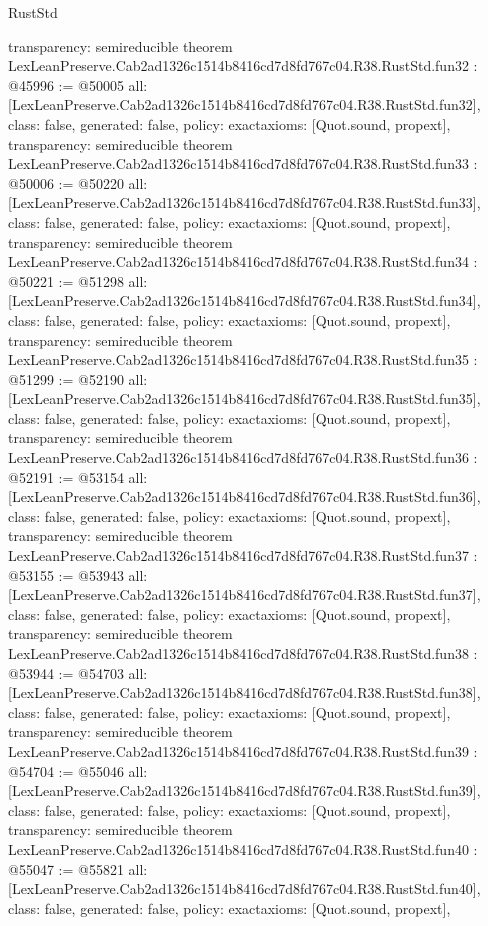 \begin{lexlean}{RustStd}
\begin{coremodule}
{  transparency: semireducible
}
theorem LexLeanPreserve.Cab2ad1326c1514b8416cd7d8fd767c04.R38.RustStd.fun32 : @45996 := @50005 {
  all: [LexLeanPreserve.Cab2ad1326c1514b8416cd7d8fd767c04.R38.RustStd.fun32],
  class: false,
  generated: false,
  policy: exact{axioms: [Quot.sound, propext]},
  transparency: semireducible
}
theorem LexLeanPreserve.Cab2ad1326c1514b8416cd7d8fd767c04.R38.RustStd.fun33 : @50006 := @50220 {
  all: [LexLeanPreserve.Cab2ad1326c1514b8416cd7d8fd767c04.R38.RustStd.fun33],
  class: false,
  generated: false,
  policy: exact{axioms: [Quot.sound, propext]},
  transparency: semireducible
}
theorem LexLeanPreserve.Cab2ad1326c1514b8416cd7d8fd767c04.R38.RustStd.fun34 : @50221 := @51298 {
  all: [LexLeanPreserve.Cab2ad1326c1514b8416cd7d8fd767c04.R38.RustStd.fun34],
  class: false,
  generated: false,
  policy: exact{axioms: [Quot.sound, propext]},
  transparency: semireducible
}
theorem LexLeanPreserve.Cab2ad1326c1514b8416cd7d8fd767c04.R38.RustStd.fun35 : @51299 := @52190 {
  all: [LexLeanPreserve.Cab2ad1326c1514b8416cd7d8fd767c04.R38.RustStd.fun35],
  class: false,
  generated: false,
  policy: exact{axioms: [Quot.sound, propext]},
  transparency: semireducible
}
theorem LexLeanPreserve.Cab2ad1326c1514b8416cd7d8fd767c04.R38.RustStd.fun36 : @52191 := @53154 {
  all: [LexLeanPreserve.Cab2ad1326c1514b8416cd7d8fd767c04.R38.RustStd.fun36],
  class: false,
  generated: false,
  policy: exact{axioms: [Quot.sound, propext]},
  transparency: semireducible
}
theorem LexLeanPreserve.Cab2ad1326c1514b8416cd7d8fd767c04.R38.RustStd.fun37 : @53155 := @53943 {
  all: [LexLeanPreserve.Cab2ad1326c1514b8416cd7d8fd767c04.R38.RustStd.fun37],
  class: false,
  generated: false,
  policy: exact{axioms: [Quot.sound, propext]},
  transparency: semireducible
}
theorem LexLeanPreserve.Cab2ad1326c1514b8416cd7d8fd767c04.R38.RustStd.fun38 : @53944 := @54703 {
  all: [LexLeanPreserve.Cab2ad1326c1514b8416cd7d8fd767c04.R38.RustStd.fun38],
  class: false,
  generated: false,
  policy: exact{axioms: [Quot.sound, propext]},
  transparency: semireducible
}
theorem LexLeanPreserve.Cab2ad1326c1514b8416cd7d8fd767c04.R38.RustStd.fun39 : @54704 := @55046 {
  all: [LexLeanPreserve.Cab2ad1326c1514b8416cd7d8fd767c04.R38.RustStd.fun39],
  class: false,
  generated: false,
  policy: exact{axioms: [Quot.sound, propext]},
  transparency: semireducible
}
theorem LexLeanPreserve.Cab2ad1326c1514b8416cd7d8fd767c04.R38.RustStd.fun40 : @55047 := @55821 {
  all: [LexLeanPreserve.Cab2ad1326c1514b8416cd7d8fd767c04.R38.RustStd.fun40],
  class: false,
  generated: false,
  policy: exact{axioms: [Quot.sound, propext]},
}
\end{coremodule}
\end{lexlean}
